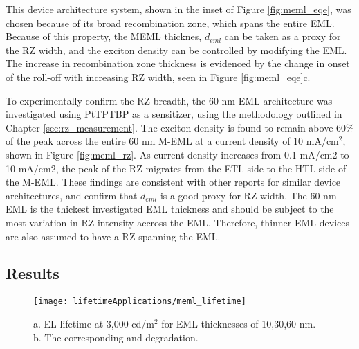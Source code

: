 \documentclass[../thesis.tex]{subfiles}
\begin{document}
This device architecture system, shown in the inset of Figure \ref{fig:meml_eqe}, was chosen because of its broad recombination zone, which spans the entire EML.\supercite{Erickson2013a}
Because of this property, the MEML thicknes, $d_{eml}$ can be taken as a proxy for the RZ width, and the exciton density can be controlled by modifying the EML.
The increase in recombination zone thickness is evidenced by the change in onset of the roll-off with increasing RZ width, seen in Figure \ref{fig:meml_eqe}c.


To experimentally confirm the RZ breadth, the 60 nm EML architecture was investigated using PtTPTBP as a sensitizer, using the methodology outlined in Chapter \ref{sec:rz_measurement}.
The exciton density is found to remain above 60\% of the peak across the entire 60 nm M-EML at a current density of 10 mA/cm$^2$, shown in Figure \ref{fig:meml_rz}. 
As current density increases from 0.1 mA/cm2 to 10 mA/cm2, the peak of the RZ migrates from the ETL side to the HTL side of the M-EML. 
These findings are consistent with other reports for similar device architectures,\supercite{Erickson2013a} and confirm that $d_{eml}$ is a good proxy for RZ width.
The 60 nm EML is the thickest investigated EML thickness and should be subject to the most variation in RZ intensity accross the EML.  
Therefore, thinner EML devices are also assumed to have a RZ spanning the EML.

\subsection{Results}

\begin{wrapfigure}{r}{.4\textwidth}
\centering
\texttt{[image: lifetimeApplications/meml\_lifetime]}
\caption{a. EL lifetime at 3,000 cd/m$^2$ for EML thicknesses of 10,30,60 nm.  b. The corresponding \pl and \ef degradation.}
\label{fig:meml_lifetime}
\end{wrapfigure}
\end{document}
